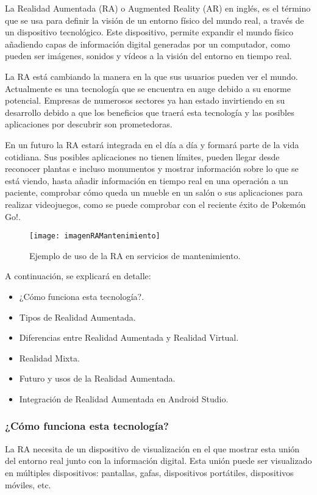 La Realidad Aumentada (RA) \cite{URL::RealidadAumentada} o Augmented Reality (AR) en inglés, es el término que se usa para definir la visión de un entorno físico del mundo real, a través de un dispositivo tecnológico. Este dispositivo, permite expandir el mundo físico añadiendo capas de información digital generadas por un computador, como pueden ser imágenes, sonidos y vídeos a la visión del entorno en tiempo real. 

La RA está cambiando la manera en la que sus usuarios pueden ver el mundo. Actualmente es una tecnología que se encuentra en auge debido a su enorme potencial. Empresas de numerosos sectores ya han estado invirtiendo en su desarrollo debido a que los beneficios que traerá esta tecnología y las posibles aplicaciones por descubrir son prometedoras.


En un futuro la RA estará integrada en el día a día y formará parte de la vida cotidiana. Sus posibles aplicaciones no tienen límites, pueden llegar desde reconocer plantas e incluso monumentos y mostrar información sobre lo que se está viendo, hasta añadir información en tiempo real en una operación a un paciente, comprobar cómo queda un mueble en un salón o sus aplicaciones para realizar videojuegos, como se puede comprobar con el reciente éxito de Pokemón Go!. 

\begin{figure}[h]
    \centering
    \texttt{[image: imagenRAMantenimiento]}
    \caption{Ejemplo de uso de la RA en servicios de mantenimiento.}
    \label{fig:googleglass}
\end{figure}

A continuación, se explicará en detalle:
\begin{itemize}
\item ¿Cómo funciona esta tecnología?.
\item Tipos de Realidad Aumentada.
\item Diferencias entre Realidad Aumentada y Realidad Virtual.
\item Realidad Mixta.
\item Futuro y usos de la Realidad Aumentada.
\item Integración de Realidad Aumentada en Android Studio.
\end{itemize}  

\subsubsection{¿Cómo funciona esta tecnología?}
La RA necesita de un dispositivo de visualización en el que mostrar esta unión del entorno real junto con la información digital. Esta unión puede ser visualizado en múltiples dispositivos: pantallas, gafas, dispositivos portátiles, dispositivos móviles, etc.
 

